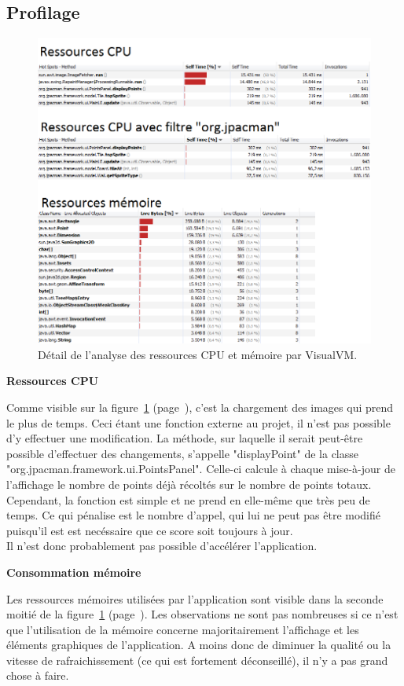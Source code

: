 \documentclass[12pt,a4paper,final]{article}
\newcommand{\smalltitle}[1]{\bigskip\large\textbf{#1}\par\normalsize\medskip}
\newcommand{\labelfigure}[1]{figure~\ref{#1} (page~\pageref{#1})}
\begin{document}
\subsection{Profilage}
\begin{figure}[!h]
	\centering
	\includegraphics[width=\textwidth]{Profilage.png}
	\caption{\label{profilage}Détail de l'analyse des ressources CPU et mémoire par VisualVM.}
\end{figure}
\smalltitle{Ressources CPU}
Comme visible sur la \labelfigure{profilage}, c'est la chargement des images qui prend le plus de temps. Ceci étant une fonction externe au projet, il n'est pas possible d'y effectuer une modification. La méthode, sur laquelle il serait peut-être possible d'effectuer des changements, s'appelle "displayPoint" de la classe "org.jpacman.framework.ui.PointsPanel". Celle-ci calcule à chaque mise-à-jour de l'affichage le nombre de points déjà récoltés sur le nombre de points totaux. Cependant, la fonction est simple et ne prend en elle-même que très peu de temps. Ce qui pénalise est le nombre d'appel, qui lui ne peut pas être modifié puisqu'il est est necéssaire que ce score soit toujours à jour. \\
Il n'est donc probablement pas possible d'accélérer l'application.

\smalltitle{Consommation mémoire}
Les ressources mémoires utilisées par l'application sont visible dans la seconde moitié de la \labelfigure{profilage}. Les observations ne sont pas nombreuses si ce n'est que l'utilisation de la mémoire concerne majoritairement l'affichage et les éléments graphiques de l'application. A moins donc de diminuer la qualité ou la vitesse de rafraichissement (ce qui est fortement déconseillé), il n'y a pas grand chose à faire.
\end{document}
